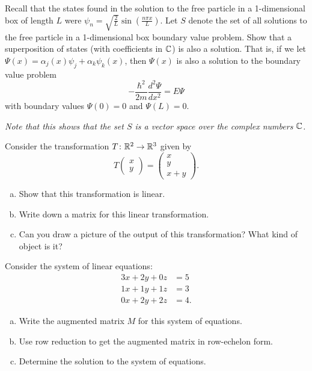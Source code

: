 \documentclass[12pt]{article} %
\begin{document}
\begin{problem}
Recall that the states found in the solution to the free particle in a 1-dimensional box of length $L$ were $\psi_n = \sqrt{\frac{2}{L}} \sin \left( \frac{n\pi x}{L}\right)$. Let $S$ denote the set of all solutions to the free particle in a 1-dimensional box boundary value problem. Show that a superposition of states (with coefficients in $\mathbb{C}$) is also a solution. That is, if we let $\Psi(x) = \alpha_{j}(x) \psi_j + \alpha_k \psi_k(x)$, then $\Psi(x)$ is also a solution to the boundary value problem
\[
-\frac{\hbar^2}{2m}\frac{d^2 \Psi}{dx^2}=E\Psi
\]
with boundary values $\Psi(0)=0$ and $\Psi(L)=0$.

\noindent \emph{Note that this shows that the set $S$ is a vector space over the complex numbers $\mathbb{C}$.}
\end{problem}

\begin{problem}
Consider the transformation $T\colon \mathbb{R}^2 \to \mathbb{R}^3$ given by
\[
T \begin{pmatrix} x \\ y \end{pmatrix} = \begin{pmatrix} x \\ y \\ x+y \end{pmatrix}.
\]
\begin{enumerate}[(a)]
    \item Show that this transformation is linear.
    \item Write down a matrix for this linear transformation.
    \item Can you draw a picture of the output of this transformation? What kind of object is it?
\end{enumerate}
\end{problem}

\begin{problem}
Consider the system of linear equations:
\begin{align*}
    3x+2y+0z&=5\\
    1x+1y+1z&=3\\
    0x+2y+2z&=4.
\end{align*}
\begin{enumerate}[(a)]
    \item Write the augmented matrix $M$ for this system of equations.
    \item Use row reduction to get the augmented matrix in row-echelon form.
    \item Determine the solution to the system of equations.
\end{enumerate}
\end{problem}
\end{document}
